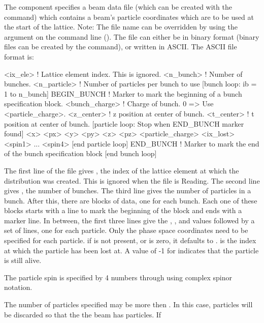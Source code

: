 {{{{{{{{{{{{{{The  component specifies a beam data file (which can be
created with the  command) which
contains a beam's particle coordinates which are to be used at the
start of the lattice.  Note: The file name can be overridden by using
the  argument on the command line
(). The file can either be in binary format
(binary files can be created by the  command), or
written in ASCII. The ASCII file format is:
\begin{example}
  <ix_ele>         ! Lattice element index. This is ignored.
  <n_bunch>        ! Number of bunches.
  <n_particle>     ! Number of particles per bunch to use
  [bunch loop: ib = 1 to n_bunch]
    BEGIN_BUNCH    ! Marker to mark the beginning of a bunch specification block.
    <bunch_charge> ! Charge of bunch. 0 => Use <particle_charge>.
    <z_center>     ! z position at center of bunch.
    <t_center>     ! t position at center of bunch.
    [particle loop: Stop when END_BUNCH marker found]
      <x> <px> <y> <py> <z> <pz> <particle_charge> <ix_lost> <spin1> ... <spin4>
    [end particle loop]
    END_BUNCH      ! Marker to mark the end of the bunch specification block
  [end bunch loop]
\end{example}
The first line of the file gives , the index of the lattice
element at which the distribution was created. This is ignored when
the file is Reading. The second line gives , the number
of bunches. The third line gives  the number of
particles in a bunch. After this, there are  blocks of
data, one for each bunch. Each one of these blocks starts with a
 line to mark the beginning of the block and ends with
a  marker line. In between, the first three lines give
the , , and  values followed by a set of
lines, one for each particle. Only the phase space coordinates need to
be specified for each particle. if  is not
present, or is zero, it defaults to .
 is the index at which the particle has been lost at. A
value of -1 for  indicates that the particle is still
alive.

The particle spin is specified by 4 numbers  through
 using complex spinor notation.

The number of particles specified may be more then
. In this case, particles will be discarded so that
the the beam has  particles. If
\vn{beam_init%
override the setting of \vn{<n_particle>} in the beam file.

}}}}}}}}}}}}}}}
